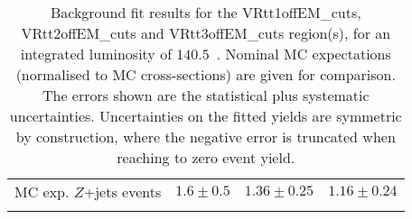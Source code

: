 \begin{table}
\begin{center}
{\begin{tabular*}{\textwidth}{@{\extracolsep{\fill}}lrrr}
        MC exp. $Z$+jets events         & $1.6 \pm 0.5$          & $1.36 \pm 0.25$          & $1.16 \pm 0.24$              \\
\noalign{\smallskip}\hline\noalign{\smallskip}
\end{tabular*}
}
\end{center}
\caption{ Background fit results for the VRtt1offEM\_cuts, VRtt2offEM\_cuts and VRtt3offEM\_cuts region(s),  for an integrated luminosity of $140.5$~\ifb.
Nominal MC expectations (normalised to MC cross-sections) are given for comparison. 
The errors shown are the statistical plus systematic uncertainties.
Uncertainties on the fitted yields are symmetric by construction, 
where the negative error is truncated when reaching to zero event yield.
}
\label{table.results.yields.fit.VR}
\end{table}
%